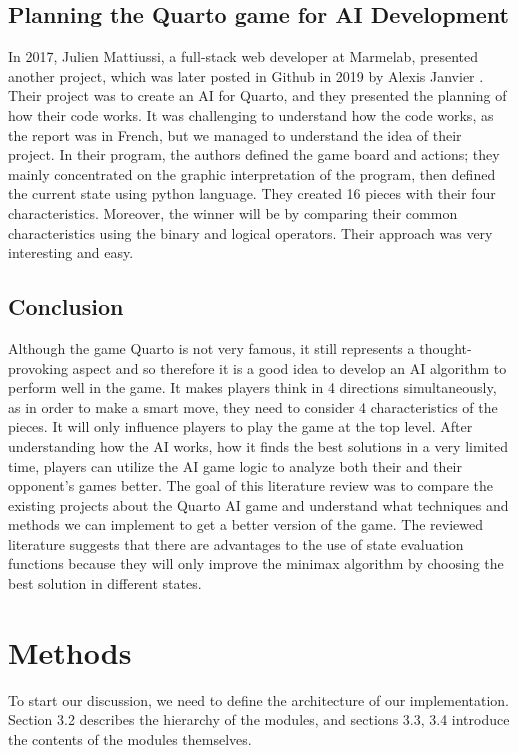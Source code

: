 \documentclass[paper=a4, fontsize=11pt]{article} %
\begin{document}
\subsection{Planning the Quarto game for AI Development}
In 2017, Julien Mattiussi, a full-stack web developer at Marmelab, presented another project, which was later posted in Github in 2019 by Alexis Janvier \cite{Mattiussi2018}. Their project was to create an AI for Quarto, and they presented the planning of how their code works. 
It was challenging to understand how the code works, as the report was in French, but we managed to understand the idea of their project. In their program, the authors defined the game board and actions; they mainly concentrated on the graphic interpretation of the program, then defined the current state using python language. They created 16 pieces with their four characteristics. Moreover, the winner will be by comparing their common characteristics using the binary and logical operators. Their approach was very interesting and easy. 

\subsection{Conclusion}
Although the game Quarto is not very famous, it still represents a thought-provoking aspect and so therefore it is a good idea to develop an AI algorithm to perform well in the game. It makes players think in 4 directions simultaneously, as in order to make a smart move, they need to consider 4 characteristics of the pieces. It will only influence players to play the game at the top level. After understanding how the AI works, how it finds the best solutions in a very limited time, players can utilize the AI game logic to analyze both their and their opponent’s games better. 
The goal of this literature review was to compare the existing projects about the Quarto AI game and understand what techniques and methods we can implement to get a better version of the game. The reviewed literature suggests that there are advantages to the use of state evaluation functions because they will only improve the minimax algorithm by choosing the best solution in different states. 


\section{Methods} \label{txt:tech}
To start our discussion, we need to define the architecture of our implementation. Section 3.2 describes the hierarchy of the modules, and sections 3.3, 3.4 introduce the contents of the modules themselves. 
\end{document}
